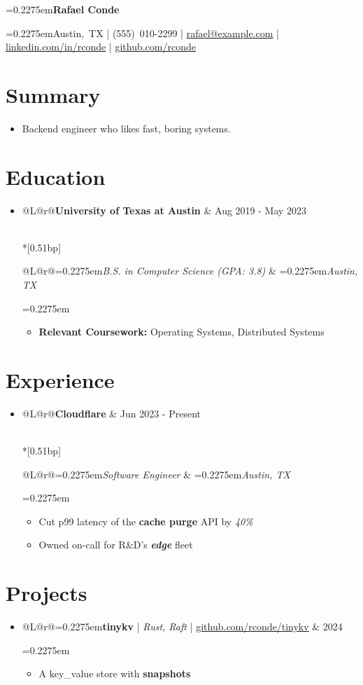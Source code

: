 \documentclass[letterpaper,11pt]{article}
\makeatletter
\newcommand*{\latospace}{\spaceskip=0.2275em\relax}
\renewcommand{\small}{\fontsize{10bp}{11.97bp}\selectfont\latospace}
\renewcommand{\Huge}{\fontsize{24.88bp}{29.77bp}\selectfont\latospace}
\newcommand{\resumeRow}[2]{{%
  \renewcommand{\tabularxcolumn}[1]{b{##1}}%
  \begin{tabularx}{\linewidth}{@{}L@{\hspace{0.8em}}r@{}}#1 & #2\end{tabularx}%
}}
\newcommand{\resumeSubheading}[4]{
  \item
    \resumeRow{\textbf{#1}}{#2} \\*[0.51bp]
    \resumeRow{\small\textit{#3}}{\small\textit{#4}}%
}
\newcommand{\resumeProjectHeading}[2]{
  \item
    \resumeRow{\small#1}{#2}%
}
\newcommand{\resumeItem}[1]{\item\relax #1}
\newcommand{\resumeSubHeadingListStart}[1][5.72bp]{%
  \begin{itemize}[leftmargin=0.15in, rightmargin=0.075in, label={}, topsep=0pt, partopsep=0pt, parsep=0pt, itemsep=#1]%
}
\newcommand{\resumeSubHeadingListEnd}{\end{itemize}}
\newcommand{\resumeItemListStart}[1][2.7bp]{%
  \par\nopagebreak\vspace{#1}\begingroup\small
  \begin{itemize}[label=\textbullet, leftmargin=*, labelindent=17pt, labelsep=5pt, topsep=0pt, partopsep=0pt, parsep=0pt,
    beginpenalty=10000, itemsep=1.8bp]%
}
\newcommand{\resumeItemListEnd}{\end{itemize}\endgroup}
\newcommand{\resumeTextStart}{%
  \begin{itemize}[leftmargin=0.15in, rightmargin=0.075in, label={}, topsep=0pt, partopsep=0pt,
    parsep=6.6bp]\item\relax
}
\newcommand{\resumeTextEnd}{\end{itemize}}
\makeatother
\begin{document}
{\centering
    {\Huge\bfseries Rafael Conde\par}
    \prevdepth=0pt\vspace{1.7bp}
    \small \mbox{Austin, TX} |
    \mbox{(555) 010-2299} |
    \href{mailto:rafael@example.com}{\underline{rafael@example.com}} |
    \href{https://linkedin.com/in/rconde}{\underline{linkedin.com/in/rconde}} |
    \href{https://github.com/rconde}{\underline{github.com/rconde}}
\par}
\vspace{2bp}

\section{Summary}
  \resumeTextStart
    Backend engineer who likes fast, boring systems.
  \resumeTextEnd

\section{Education}
  \resumeSubHeadingListStart
    \resumeSubheading
      {University of Texas at Austin}{Aug 2019 - May 2023}
      {B.S. in Computer Science (GPA: 3.8)}{Austin, TX}
      \resumeItemListStart
        \resumeItem{\textbf{Relevant Coursework:} Operating Systems, Distributed Systems}
      \resumeItemListEnd
  \resumeSubHeadingListEnd

\section{Experience}
  \resumeSubHeadingListStart
    \resumeSubheading
      {Cloudflare}{Jun 2023 - Present}
      {Software Engineer}{Austin, TX}
      \resumeItemListStart
        \resumeItem{Cut p99 latency of the \textbf{cache purge} API by \textit{40\%}}
        \resumeItem{Owned on-call for R\&D's \textbf{\textit{edge}} fleet}
      \resumeItemListEnd
  \resumeSubHeadingListEnd

\section{Projects}
  \resumeSubHeadingListStart
    \resumeProjectHeading
      {\textbf{tinykv} | \emph{Rust, Raft} | \href{https://github.com/rconde/tinykv}{\underline{github.com/rconde/tinykv}}}{2024}
      \resumeItemListStart
        \resumeItem{A key\_value store with \textbf{snapshots}}
      \resumeItemListEnd
  \resumeSubHeadingListEnd
\end{document}
